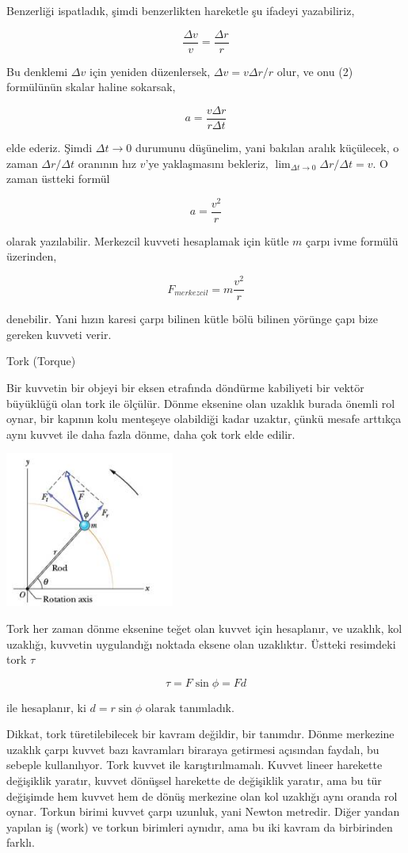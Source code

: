 \documentclass[12pt,fleqn]{article}\usepackage{../../common}
\begin{document}
Benzerliği ispatladık, şimdi benzerlikten hareketle şu ifadeyi yazabiliriz,

$$
\frac{\Delta v}{v} = \frac{\Delta r}{r}
$$

Bu denklemi $\Delta v$ için yeniden düzenlersek, $\Delta v = v \Delta r / r$
olur, ve onu (2) formülünün skalar haline sokarsak,

$$
a = \frac{v \Delta r}{r \Delta t}
$$

elde ederiz. Şimdi $\Delta t \to 0$ durumunu düşünelim, yani bakılan aralık
küçülecek, o zaman $\Delta r / \Delta t$ oranının hız $v$'ye yaklaşmasını
bekleriz, $\lim_{\Delta t \to 0} \Delta r / \Delta t = v$.
O zaman üstteki formül

$$
a = \frac{v^2}{r}
$$

olarak yazılabilir. Merkezcil kuvveti hesaplamak için kütle $m$ çarpı ivme
formülü üzerinden,

$$
F_{merkezcil} = m \frac{v^2}{r}
$$

denebilir. Yani hızın karesi çarpı bilinen kütle bölü bilinen yörünge çapı
bize gereken kuvveti verir.

Tork (Torque)

Bir kuvvetin bir objeyi bir eksen etrafında döndürme kabiliyeti bir vektör
büyüklüğü olan tork ile ölçülür. Dönme eksenine olan uzaklık burada önemli
rol oynar, bir kapının kolu menteşeye olabildiği kadar uzaktır, çünkü
mesafe arttıkça aynı kuvvet ile daha fazla dönme, daha çok tork elde
edilir.

\includegraphics[width=15em]{phy_005_basics_02_12.jpg}

Tork her zaman dönme eksenine teğet olan kuvvet için hesaplanır, ve
uzaklık, kol uzaklığı, kuvvetin uygulandığı noktada eksene olan
uzaklıktır. Üstteki resimdeki tork $\tau$

$$
\tau = F \sin \phi = F d
$$

ile hesaplanır, ki $d = r \sin\phi$ olarak tanımladık.

Dikkat, tork türetilebilecek bir kavram değildir, bir tanımdır. Dönme merkezine
uzaklık çarpı kuvvet bazı kavramları biraraya getirmesi açısından faydalı, bu
sebeple kullanılıyor. Tork kuvvet ile karıştırılmamalı. Kuvvet lineer harekette
değişiklik yaratır, kuvvet dönüşsel harekette de değişiklik yaratır, ama bu tür
değişimde hem kuvvet hem de dönüş merkezine olan kol uzaklığı aynı oranda rol
oynar. Torkun birimi kuvvet çarpı uzunluk, yani Newton metredir. Diğer yandan
yapılan iş (work) ve torkun birimleri aynıdır, ama bu iki kavram da birbirinden
farklı.
\end{document}
